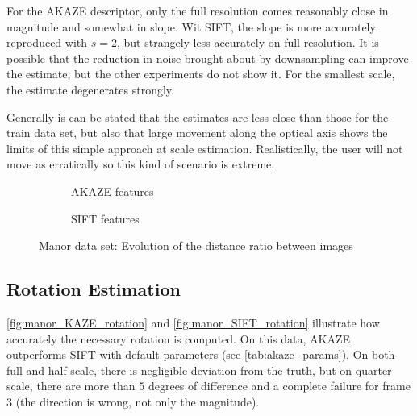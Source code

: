 For the AKAZE descriptor, only the full resolution comes reasonably close in
magnitude and somewhat in slope. Wit SIFT, the slope is more accurately
reproduced with $s=2$, but strangely less accurately on full resolution. It is
possible that the reduction in noise brought about by downsampling can improve
the estimate, but the other experiments do not show it. For the
smallest scale, the estimate degenerates strongly.

Generally is can be stated that the estimates are less close than those for the
train data set, but also that large movement along the optical axis shows the
limits of this simple approach at scale estimation. Realistically, the user will
not move as erratically so this kind of scenario is extreme.

\begin{figure}
   \begin{subfigure}[b]{.5\linewidth}
      \centering      
      
      \caption{AKAZE features}
      \label{fig:manor_KAZE_dist_ratio}
   \end{subfigure}
   \quad\begin{subfigure}[b]{.5\linewidth}
      \centering      
      
      \caption{SIFT features}
      \label{fig:manor_SIFT_dist_ratio}
   \end{subfigure}
   \caption[Manor Data: distance ratio]{Manor data set: Evolution of the distance ratio between images}
   \label{fig:manor_dist_ratio}
\end{figure}

\subsection{Rotation Estimation}

\autoref{fig:manor_KAZE_rotation} and \autoref{fig:manor_SIFT_rotation}
illustrate how accurately the necessary rotation is computed. On this data, AKAZE
outperforms SIFT with default parameters (see \autoref{tab:akaze_params}). On both full and
half scale, there is negligible deviation from the truth, but on quarter scale,
there are more than $5$ degrees of difference and a complete failure for frame
$3$ (the direction is wrong, not only the magnitude).

